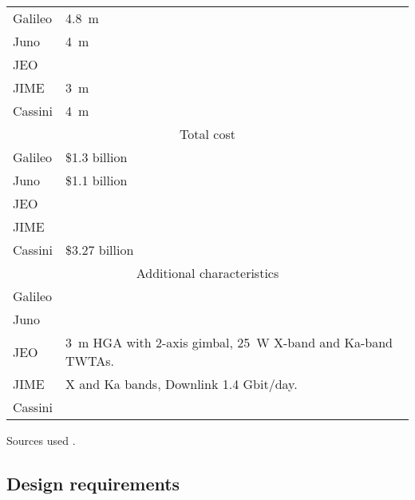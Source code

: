 \begin{longtable}{lp{}}
  Galileo & \SI{4.8}{m} \\

  Juno & \SI{4}{m} \\

  JEO & \\

  JIME & \SI{3}{m} \\

  Cassini & \SI{4}{m} \\

  \multicolumn{2}{c}{Total cost} \\ \midrule

  Galileo & \$1.3 billion \\

  Juno & \$1.1 billion \\

  JEO & \\

  JIME & \\

  Cassini & \$3.27 billion \\

  \multicolumn{2}{c}{Additional characteristics} \\ \midrule

  Galileo & \\

  Juno & \\

  JEO & \SI{3}{m} HGA with 2-axis gimbal, \SI{25}{W} X-band and
  Ka-band TWTAs. \\

  JIME & X and Ka bands, Downlink 1.4 Gbit/day. \\

  Cassini & \\
\end{longtable}

Sources used
\cite{Galileo,Galileo2,Juno,JEO,Juice,Juice2,Cassini,Cassini2}.



\subsection{Design requirements}

